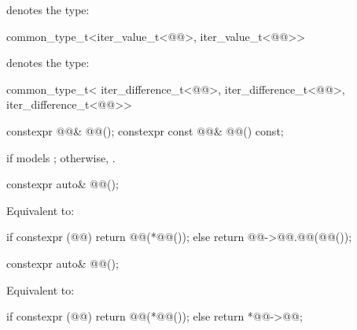\pnum
{} denotes the type:
\begin{codeblock}
common_type_t<iter_value_t<@@>, iter_value_t<@@>>
\end{codeblock}

\pnum
{} denotes the type:
\begin{codeblock}
common_type_t<
  iter_difference_t<@@>,
  iter_difference_t<@@>,
  iter_difference_t<@@>>
\end{codeblock}

%
\begin{itemdecl}
constexpr @@& @@();
constexpr const @@& @@() const;
\end{itemdecl}

\begin{itemdescr}
\pnum
\returns
{} if  models ;
otherwise, .
\end{itemdescr}

%
\begin{itemdecl}
constexpr auto& @@();
\end{itemdecl}

\begin{itemdescr}
\pnum
\effects
Equivalent to:
\begin{codeblock}
if constexpr (@@)
  return @@(*@@());
else
  return @@->@@.@@(@@());
\end{codeblock}
\end{itemdescr}

%
\begin{itemdecl}
constexpr auto& @@();
\end{itemdecl}

\begin{itemdescr}
\pnum
\effects
Equivalent to:
\begin{codeblock}
if constexpr (@@)
  return @@(*@@());
else
  return *@@->@@;
\end{codeblock}
\end{itemdescr}

